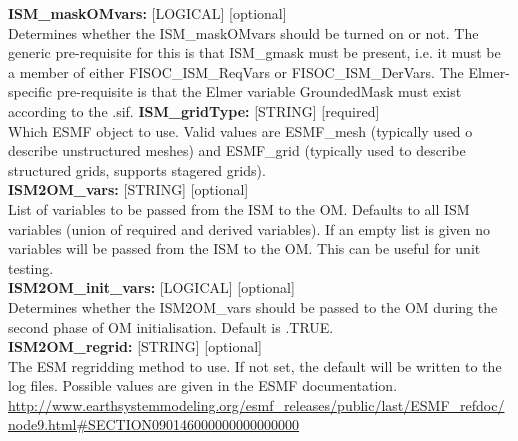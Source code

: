 \documentclass[12pt]{article}
\begin{document}
\begin{flushleft}
\textbf{ISM\_maskOMvars:} [LOGICAL] [optional]                             \\
Determines whether the ISM\_maskOMvars should be turned on or not. The generic
pre-requisite for this is that ISM\_gmask must be present, i.e. it must be a 
member of either FISOC\_ISM\_ReqVars or FISOC\_ISM\_DerVars.
The Elmer-specific pre-requisite is that the Elmer variable GroundedMask must
exist according to the .sif.
\vspace{6pt}
\textbf{ISM\_gridType:}        [STRING] [required]                          \\
Which ESMF object to use.  Valid values are ESMF\_mesh (typically used 
o describe unstructured meshes) and ESMF\_grid (typically used to 
describe structured grids, supports stagered grids).                       \\
\vspace{6pt}
\textbf{ISM2OM\_vars:}        [STRING] [optional]                          \\
List of variables to be passed from the ISM to the OM. Defaults to 
all ISM variables (union of required and derived variables). If an empty 
list is given no variables will be passed from the ISM to the OM.  This 
can be useful for unit testing.                                            \\ 
\vspace{6pt}
\textbf{ISM2OM\_init\_vars:}  [LOGICAL] [optional]                         \\
Determines whether the ISM2OM\_vars should be passed to the OM during the 
second phase of OM initialisation.   Default is .TRUE.                     \\ 
\vspace{6pt}
\textbf{ISM2OM\_regrid:}       [STRING] [optional]                         \\
The ESM regridding method to use.  If not set, the default will be 
written to the log files.  Possible values are given in the ESMF 
documentation. 
\url{http://www.earthsystemmodeling.org/esmf_releases/public/last/ESMF_refdoc/node9.html#SECTION090146000000000000000}

\vspace{22pt}


\end{flushleft}
\end{document}
